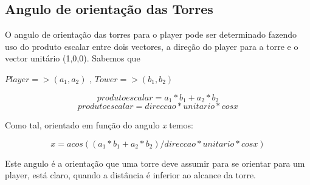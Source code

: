 \subsection{Angulo de orientação das Torres}

O angulo de orientação das torres para o player pode ser determinado fazendo uso do produto escalar entre dois vectores, a direção do player para a torre e o vector unitário (1,0,0). Sabemos que

\-
\begin{center}
\begin{math}
Player => (a_1,a_2)
\end{math}
,
\begin{math}
Tower => (b_1,b_2)
\end{math}

\begin{equation}
produto escalar = a_1*b_1 + a_2*b_2
\end{equation}
\begin{equation}
produto escalar = direccao * unitario * cos x
\end{equation}
\end{center}

Como tal, orientado em função do angulo \emph{x} temos:

\begin{equation}
x = acos( (a_1*b_1 + a_2*b_2 ) / direccao * unitario * cos x )
\end{equation}


Este angulo é a orientação que uma torre deve assumir para se orientar para um player, está claro, quando a distância é inferior ao alcance da torre.




